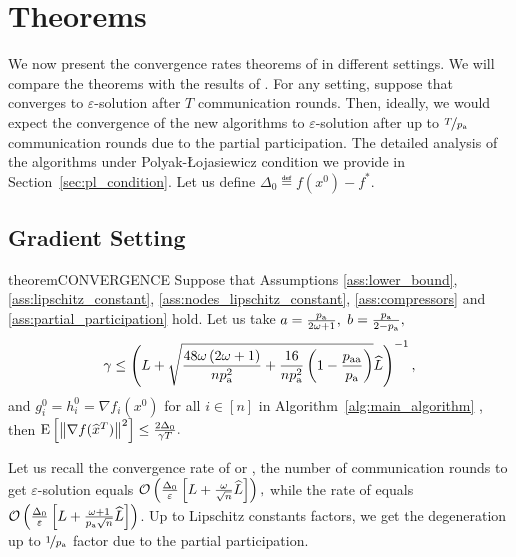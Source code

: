 \documentclass{article}
\newcommand{\algorithmname}{DARIA}
\newcommand*{\probavailable}{\ensuremath{p_{\textnormal{a}}}}
\newcommand*{\probpairaa}{\ensuremath{p_{\textnormal{aa}}}}
\begin{document}
\section{Theorems}

\label{sec:theorems}

We now present the convergence rates theorems of \algname{\algorithmname} in different settings. We will compare the theorems with the results of . For any setting, suppose that  converges to $\varepsilon$-solution after $T$ communication rounds. Then, ideally, we would expect the convergence of the new algorithms to $\varepsilon$-solution after up to $\nicefrac{T}{\probavailable}$ communication rounds due to the partial participation. The detailed analysis of the algorithms under Polyak-\L ojasiewicz condition we provide in Section~\ref{sec:pl_condition}. Let us define $\Delta_0 \eqdef f(x^0) - f^*.$

\subsection{Gradient Setting}

\label{sec:gradien_setting}

\begin{restatable}{theorem}{CONVERGENCE}
  \label{theorem:gradient_oracle}
  Suppose that Assumptions \ref{ass:lower_bound}, \ref{ass:lipschitz_constant}, \ref{ass:nodes_lipschitz_constant}, \ref{ass:compressors} and \ref{ass:partial_participation} hold. Let us take $a = \frac{\probavailable}{2 \omega + 1} ,$ $b = \frac{\probavailable}{2 - \probavailable},$ $$\gamma \leq \left(L + \sqrt{\frac{48 \omega \left(2 \omega + 1\right)}{n \probavailable^2} + \frac{16}{n \probavailable^2}\left(1 - \frac{\probpairaa}{\probavailable}\right)}\widehat{L}\right)^{-1},$$ and $g^{0}_i = h^{0}_i = \nabla f_i(x^0)$ for all $i \in [n]$
  in Algorithm~\ref{alg:main_algorithm} \algname{(\algorithmname)}, then ${\rm E}\left[\left\| \nabla f(\widehat{x}^T) \right\|^2\right] \leq \frac{2 \Delta_0}{\gamma T}.$
\end{restatable}

Let us recall the convergence rate of  or , the number of communication rounds to get $\varepsilon$-solution equals
$\mathcal{O}\left(\frac{\Delta_0}{\varepsilon}\left[L + \frac{\omega}{\sqrt{n}}\widehat{L}\right]\right),$ while the rate of \algname{\algorithmname} equals $\cO\left(\frac{\Delta_0}{\varepsilon}\left[L + \frac{\omega + 1}{\probavailable \sqrt{n}}\widehat{L}\right]\right)$. Up to Lipschitz constants factors, we get the degeneration up to $\nicefrac{1}{\probavailable}$ factor due to the partial participation.
\end{document}
